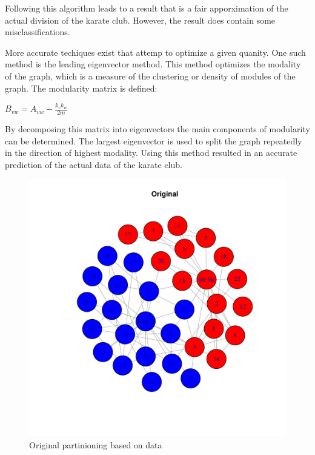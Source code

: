 Following this algorithm leads to a result that is a fair apporximation of the actual division of the karate club. However, the result does contain some misclassifications. 


More accurate techiques exist that attemp to optimize a given quanity. One such method is the leading eigenvector method. This method optimizes the modality of the graph, which is a measure of the clustering or density of modules of the graph. The modularity matrix is defined:

\begin{center}


$ B_{vw} = A_{vw} - \frac{k_v k_w}{2m} $

\end{center}

By decomposing this matrix into eigenvectors the main components of modularity can be determined. The largest eigenvector is used to split the graph repeatedly in the direction of highest modality. Using this method resulted in an accurate prediction of the actual data of the karate club. 







\begin{figure}[H]
\centering 
\includegraphics[width=.8\textwidth]{../Rplots.pdf}
\caption{Original partinioning based on data}
\end{figure}

